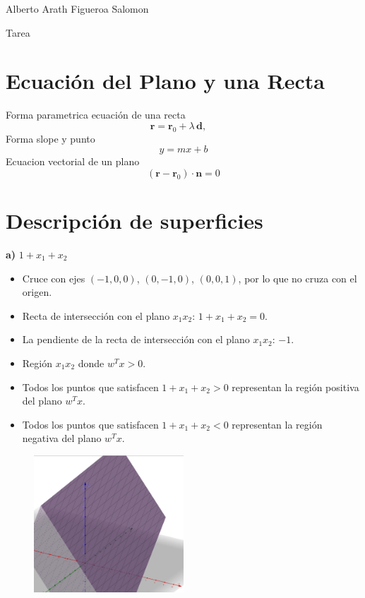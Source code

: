 \documentclass{article}
\begin{document}
Alberto Arath Figueroa Salomon

Tarea
\section{Ecuación del Plano y una Recta}
\begin{center}
Forma parametrica ecuación de una recta
\[
\mathbf{r} = \mathbf{r}_0 + \lambda\,\mathbf{d},\quad
\]
Forma slope y punto
\[
y = m x + b
\]
Ecuacion vectorial de un plano
\[
    (\mathbf{r} - \mathbf{r}_0) \cdot \mathbf{n} = 0
    \]
    
\end{center}


\section{Descripción de superficies}
\textbf{a) } $1 + x_1 + x_2$  
\begin{itemize}
    \item Cruce con ejes $(-1, 0, 0)$, $(0, -1, 0)$, $(0, 0, 1)$, por lo que no cruza con el origen.
    \item Recta de intersección con el plano $x_1x_2$: $1 + x_1 + x_2 = 0$.
    \item La pendiente de la recta de intersección con el plano $x_1x_2$: $-1$.
    \item Región $x_1x_2$ donde $w^T x > 0$.
    \item Todos los puntos que satisfacen $1 + x_1 + x_2 > 0$ representan la región positiva del plano $w^T x$.
    \item Todos los puntos que satisfacen $1 + x_1 + x_2 < 0$ representan la región negativa del plano $w^T x$.
\end{itemize}
\begin{figure}[H]
    \centering
    \includegraphics[width=0.5\textwidth]{Imagen1.png}  %
\end{figure}
\end{document}
